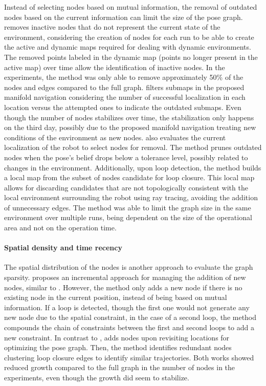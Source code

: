 Instead of selecting nodes based on mutual information, the removal of outdated nodes based on the current information can limit the size of the pose graph.
\cite{walcott-bryant-et-al:2012:6385561} removes inactive nodes that do not represent the current state of the environment, considering the creation of nodes for each run to be able to create the active and dynamic maps required for dealing with dynamic environments. The removed points labeled in the dynamic map (points no longer present in the active map) over time allow the identification of inactive nodes. In the experiments, the method was only able to remove approximately 50\% of the nodes and edges compared to the full graph.
\cite{tang-et-al:2019:7} filters submaps in the proposed manifold navigation considering the number of successful localization in each location versus the attempted ones to indicate the outdated submaps. Even though the number of nodes stabilizes over time, the stabilization only happens on the third day, possibly due to the proposed manifold navigation treating new conditions of the environment as new nodes.
\cite{boniardi-et-al:2019:003} also evaluates the current localization of the robot to select nodes for removal. The method prunes outdated nodes when the pose's belief drops below a tolerance level, possibly related to changes in the environment. Additionally, upon loop detection, the method builds a local map from the subset of nodes candidate for loop closure. This local map allows for discarding candidates that are not topologically consistent with the local environment surrounding the robot using ray tracing, avoiding the addition of unnecessary edges. The method was able to limit the graph size in the same environment over multiple runs, being dependent on the size of the operational area and not on the operation time.


\paragraph{Spatial density and time recency}

The spatial distribution of the nodes is another approach to evaluate the graph sparsity.
\cite{johannsson-et-al:2013:6630556} proposes an incremental approach for managing the addition of new nodes, similar to \cite{ila-et-al:2017:0278364917691110}. However, the method only adds a new node if there is no existing node in the current position, instead of being based on mutual information. If a loop is detected, though the first one would not generate any new node due to the spatial constraint, in the case of a second loop, the method compounds the chain of constraints between the first and second loops to add a new constraint.
In contrast to \cite{johannsson-et-al:2013:6630556}, \cite{zeng-si:2021:6} adds nodes upon revisiting locations for optimizing the pose graph. Then, the method identifies redundant nodes clustering loop closure edges to identify similar trajectories.
Both works showed reduced growth compared to the full graph in the number of nodes in the experiments, even though the growth did seem to stabilize.

